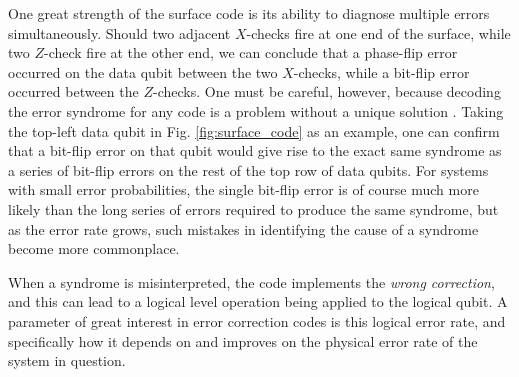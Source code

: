 One great strength of the surface code is its ability to diagnose multiple
errors simultaneously. Should two adjacent $X$-checks fire at one end of the
surface, while two $Z$-check fire at the other end, we can conclude that a
phase-flip error occurred on the data qubit between the two $X$-checks, while a
bit-flip error occurred between the $Z$-checks. One must be careful, however,
because decoding the error syndrome for any code is a problem without a unique
solution \cite{terhal15}. Taking the top-left data qubit in Fig. \ref{fig:surface_code} as an
example, one can confirm that a bit-flip error on that qubit would give rise to
the exact same syndrome as a series of bit-flip errors on the rest of the top
row of data qubits. For systems with small error probabilities, the single
bit-flip error is of course much more likely than the long series of errors
required to produce the same syndrome, but as the error rate grows, such
mistakes in identifying the cause of a syndrome become more commonplace. 

When a syndrome is misinterpreted, the code implements the \textit{wrong
  correction}, and this can lead to a logical level operation being applied to
the logical qubit. A parameter of great interest in error correction codes is
this logical error rate, and specifically how it depends on and improves on the
physical error rate of the system in question. 


